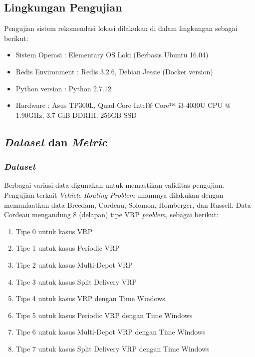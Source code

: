 \subsection{Lingkungan Pengujian}
\label{ssec:test-environment}
Pengujian sistem rekomendasi lokasi dilakukan di dalam lingkungan sebagai berikut:
\begin{itemize}
\item Sistem Operasi		: Elementary OS Loki (Berbasis Ubuntu 16.04)
\item Redis Environment		: Redis 3.2.6, Debian Jessie (Docker version)
\item Python version		: Python 2.7.12
\item Hardware				: Asus TP300L, Quad-Core Intel® Core™ i3-4030U CPU @ 1.90GHz, 3,7 GiB DDRIII, 256GB SSD
\end{itemize}


\subsection{\textit{Dataset} dan \textit{Metric}}
\subsubsection{\textit{Dataset}}
Berbagai variasi data digunakan untuk memastikan validitas pengujian. Pengujian terkait \textit{Vehicle Routing Problem} umumnya dilakukan dengan memanfaatkan data Breedam, Cordeau, Solomon, Homberger, dan Russell. Data Cordeau mengandung 8 (delapan) tipe VRP \textit{problem}, sebagai berikut:

\begin{enumerate}
\item Tipe 0 untuk kasus VRP
\item Tipe 1 untuk kasus Periodic VRP
\item Tipe 2 untuk kasus Multi-Depot VRP
\item Tipe 3 untuk kasus Split Delivery VRP
\item Tipe 4 untuk kasus VRP dengan Time Windows
\item Tipe 5 untuk kasus Periodic VRP dengan Time Windows
\item Tipe 6 untuk kasus Multi-Depot VRP dengan Time Windows
\item Tipe 7 untuk kasus Split Delivery VRP dengan Time Windows
\end{enumerate}

